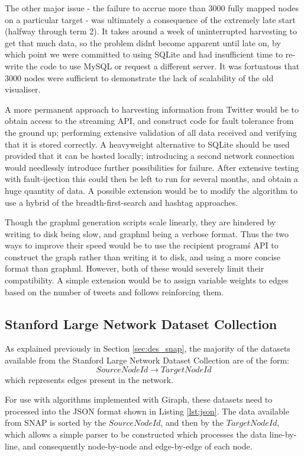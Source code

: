 The other major issue - the failure to accrue more than 3000 fully mapped nodes on a particular target - was ultimately a consequence of the extremely late start (halfway through term 2). It takes around a week of uninterrupted harvesting to get that much data, so the problem didn\'t become apparent until late on, by which point we were committed to using SQLite and had insufficient time to re-write the code to use MySQL or request a different server. It was fortuatous that 3000 nodes were sufficient to demonstrate the lack of scalability of the old visualiser.

A more permanent approach to harvesting information from Twitter would be to obtain access to the streaming API, and construct code for fault tolerance from the ground up; performing extensive validation of all data received and verifying that it is stored correctly. A heavyweight alternative to SQLite should be used provided that it can be hosted locally; introducing a second network connection would needlessly introduce further possibilities for failure. After extensive testing with fault-ijection this could then be left to run for several months, and obtain a huge quantity of data. A possible extension would be to modify the algorithm to use a hybrid of the breadth-first-search and hashtag approaches.

Though the graphml generation scripts scale linearly, they are hindered by writing to disk being slow, and graphml being a verbose format. Thus the two ways to improve their speed would be to use the recipient program\'s API to construct the graph rather than writing it to disk, and using a more concise format than graphml. However, both of these would severely limit their compatibility. A simple extension would be to assign variable weights to edges based on the number of tweets and follows reinforcing them.

\subsection{Stanford Large Network Dataset Collection}
As explained previously in Section \ref{sec:des_snap}, the majority of the datasets available from the Stanford Large Network Dataset Collection are of the form:
  $$SourceNodeId \rightarrow TargetNodeId$$ 
which represents edges present in the network.

For use with algorithms implemented with Giraph, these datasets need to processed into the JSON format shown in Listing \ref{lst:json}. The data available from SNAP is sorted by the $SourceNodeId$, and then by the $TargetNodeId$, which allows a simple parser to be constructed which processes the data line-by-line, and consequently node-by-node and edge-by-edge of each node.

